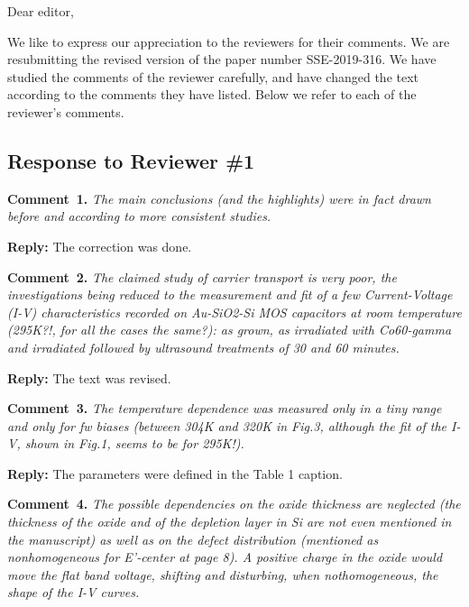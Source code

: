 \documentclass[aip,jap,preprint]{revtex4-1}
\begin{document}
Dear editor,

We like to express our appreciation to the reviewers for their comments.
We are resubmitting the revised version of the paper number  SSE-2019-316.
We have studied the comments of the reviewer carefully, and have changed the text according to the comments they
have listed.
Below we refer to each of the reviewer’s comments.



\subsection*{Response to Reviewer \#1 }

\noindent
\textcolor[rgb]{0.00,0.50,1.00}{\textbf{Comment~1.}}
\emph{The main conclusions (and the highlights) were in fact drawn before and according to more consistent studies.}

\noindent
\textcolor[rgb]{0.51,0.00,0.00}{\textbf{Reply:}}
The correction was done.



\noindent
\textcolor[rgb]{0.00,0.50,1.00}{\textbf{Comment~2.}}
\emph{The claimed study of carrier transport is very poor, the investigations being reduced to the measurement and fit of a few Current-Voltage (I-V) characteristics recorded on Au-SiO2-Si MOS capacitors at room temperature (295K?!, for all the cases the same?): as grown, as irradiated with Co60-gamma and irradiated followed by ultrasound treatments of 30 and 60 minutes.}

\noindent
\textcolor[rgb]{0.51,0.00,0.00}{\textbf{Reply:}}
The text was revised.

\noindent
\textcolor[rgb]{0.00,0.50,1.00}{\textbf{Comment~3.}}
\emph{The temperature dependence was measured only in a tiny range and only for fw biases (between 304K and 320K in Fig.3, although the fit of the I-V, shown in Fig.1, seems to be for 295K!).}


\noindent
\textcolor[rgb]{0.51,0.00,0.00}{\textbf{Reply:}}
The parameters were defined in the Table 1 caption.



\noindent
\textcolor[rgb]{0.00,0.50,1.00}{\textbf{Comment~4.}}
\emph{The possible dependencies on the oxide thickness are neglected (the thickness of the oxide and of the depletion layer in Si are not even mentioned in the manuscript) as well as on the defect distribution (mentioned as nonhomogeneous for E’-center at page 8). A positive charge in the oxide would move the flat band voltage, shifting and disturbing, when nothomogeneous, the shape of the I-V curves.}
\end{document}
